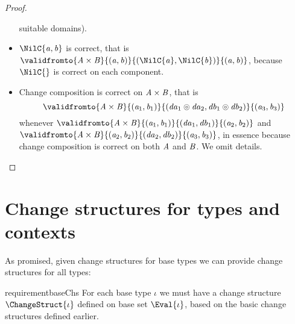\begin{proof}
\begin{itemize}
    suitable domains).
  \item \ensuremath{\NilC{\Varid{a},\Varid{b}}} is correct, that is \ensuremath{\validfromto{\Conid{A}\times\Conid{B}}{(\Varid{a},\Varid{b})}{(\NilC{\Varid{a}},\NilC{\Varid{b}})}{(\Varid{a},\Varid{b})}}, because \ensuremath{\NilC{}} is
    correct on each component.
  \item Change composition is correct on \ensuremath{\Conid{A}\times\Conid{B}}, that is
    \[\ensuremath{\validfromto{\Conid{A}\times\Conid{B}}{(\Varid{a}_{1},\Varid{b}_{1})}{(\Varid{da}_{1}\circledcirc\Varid{da}_{2},\Varid{db}_{1}\circledcirc\Varid{db}_{2})}{(\Varid{a}_{3},\Varid{b}_{3})}}\] whenever \ensuremath{\validfromto{\Conid{A}\times\Conid{B}}{(\Varid{a}_{1},\Varid{b}_{1})}{(\Varid{da}_{1},\Varid{db}_{1})}{(\Varid{a}_{2},\Varid{b}_{2})}} and \ensuremath{\validfromto{\Conid{A}\times\Conid{B}}{(\Varid{a}_{2},\Varid{b}_{2})}{(\Varid{da}_{2},\Varid{db}_{2})}{(\Varid{a}_{3},\Varid{b}_{3})}}, in essence because
    change composition is correct on both \ensuremath{\Conid{A}} and \ensuremath{\Conid{B}}. We omit details.
  \end{itemize}
\end{proof}

\section{Change structures for types and contexts}
\label{sec:chs-types-contexts}

As promised, given change structures for base types we can
provide change structures for all types:

\begin{restatable}{requirement}{baseChs}
  \label{req:base-change-structures}
  For each base type \ensuremath{\iota} we must have a change structure
  \ensuremath{\ChangeStruct{\iota}} defined on base set \ensuremath{\Eval{\iota}}, based on the
  basic change structures defined earlier.
\end{restatable}


